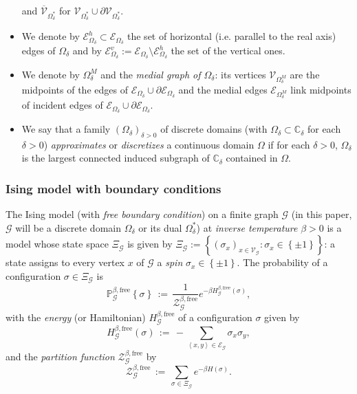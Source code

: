 \documentclass[oneside,english]{amsart}
\numberwithin{equation}{section}
\numberwithin{figure}{section}
\theoremstyle{plain}
\theoremstyle{plain}
\theoremstyle{plain}
\theoremstyle{plain}
\theoremstyle{plain}
\theoremstyle{definition}
\theoremstyle{remark}
\begin{document}
\begin{itemize}
and $\overline{\mathcal{V}}_{\Omega_{\delta}^{*}}$ for $\mathcal{V}_{\Omega_{\delta}^{*}}\cup\partial\mathcal{V}_{\Omega_{\delta}^{*}}$.
\item We denote by $\mathcal{E}_{\Omega_{\delta}}^{h}\subset\mathcal{E}_{\Omega_{\delta}}$
the set of horizontal (i.e. parallel to the real axis) edges of $\Omega_{\delta}$
and by $\mathcal{E}_{\Omega_{\delta}}^{v}:=\mathcal{E}_{\Omega_{\delta}}\setminus\mathcal{E}_{\Omega_{\delta}}^{h}$
the set of the vertical ones.
\item We denote by $\Omega_{\delta}^{M}$ and the \emph{medial graph of
$\Omega_{\delta}$}: its vertices $\mathcal{V}_{\Omega_{\delta}^{M}}$
are the midpoints of the edges of $\mathcal{E}_{\Omega_{\delta}}\cup\partial\mathcal{E}_{\Omega_{\delta}}$
and the medial edges $\mathcal{E}_{\Omega_{\delta}^{M}}$ link midpoints
of incident edges of $\mathcal{E}_{\Omega_{\delta}}\cup\partial\mathcal{E}_{\Omega_{\delta}}$. 
\item We say that a family $\left(\Omega_{\delta}\right)_{\delta>0}$ of
discrete domains (with $\Omega_{\delta}\subset\mathbb{C}_{\delta}$
for each $\delta>0$) \emph{approximates} or \emph{discretizes }a
continuous domain $\Omega$ if for each $\delta>0$, $\Omega_{\delta}$
is the largest connected induced subgraph of $\mathbb{C}_{\delta}$
contained in $\Omega$. 
\end{itemize}

\subsubsection{Ising model with boundary conditions}

The Ising model (with \emph{free boundary condition}) on a finite
graph $\mathcal{G}$ (in this paper, $\mathcal{G}$ will be a discrete
domain $\Omega_{\delta}$ or its dual $\Omega_{\delta}^{*}$) at \emph{inverse
temperature} $\beta>0$ is a model whose state space $\Xi_{\mathcal{G}}$
is given by $\Xi_{\mathcal{G}}:=\left\{ \left(\sigma_{x}\right)_{x\in\mathcal{V}_{\mathcal{G}}}:\sigma_{x}\in\left\{ \pm1\right\} \right\} $:
a state assigns to every vertex $x$ of $\mathcal{G}$ a \emph{spin}
$\sigma_{x}\in\left\{ \pm1\right\} $. The probability of a configuration
$\sigma\in\Xi_{\mathcal{G}}$ is
\[
\mathbb{P}_{\mathcal{G}}^{\beta,\mathrm{free}}\left\{ \sigma\right\} \,:=\,\frac{1}{\mathcal{Z}_{\mathcal{G}}^{\beta,\mathrm{free}}}e^{-\beta H_{\mathcal{G}}^{\beta,\mathrm{free}}\left(\sigma\right)},
\]
with the \emph{energy} (or Hamiltonian) $H_{\mathcal{G}}^{\beta,\mathrm{free}}$
of a configuration $\sigma$ given by 
\[
H_{\mathcal{G}}^{\beta,\mathrm{free}}\left(\sigma\right)\,:=\,-\sum_{\left\langle x,y\right\rangle \in\mathcal{E}_{\mathcal{G}}}\sigma_{x}\sigma_{y},
\]
and the \emph{partition function} $\mathcal{Z}_{\mathcal{G}}^{\beta,\mathrm{free}}$
by 
\[
\mathcal{Z}_{\mathcal{G}}^{\beta,\mathrm{free}}\,:=\,\sum_{\sigma\in\Xi_{\mathcal{G}}}e^{-\beta H\left(\sigma\right)}.
\]
\end{document}
